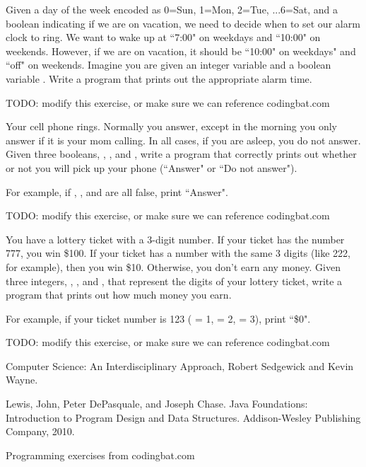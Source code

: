 \begin{exercise}
Given a day of the week encoded as 0=Sun, 1=Mon, 2=Tue, ...6=Sat, and a boolean indicating if we are on vacation, we need to decide when to set our alarm clock to ring. We want to wake up at ``7:00" on weekdays and ``10:00" on weekends. However, if we are on vacation, it should be ``10:00" on weekdays" and ``off" on weekends. Imagine you are given an integer variable  and a boolean variable . Write a program that prints out the appropriate alarm time.

TODO: modify this exercise, or make sure we can reference codingbat.com
\end{exercise}

\begin{exercise}
Your cell phone rings. Normally you answer, except in the morning you only answer if it is your mom calling. In all cases, if you are asleep, you do not answer. Given three booleans, , , and , write a program that correctly prints out whether or not you will pick up your phone (``Answer" or ``Do not answer"). 

For example, if , , and  are all false, print ``Answer". 

TODO: modify this exercise, or make sure we can reference codingbat.com
\end{exercise}

\begin{exercise}
You have a lottery ticket with a 3-digit number. If your ticket has the number 777, you win \$100. If your ticket has a number with the same 3 digits (like 222, for example), then you win \$10. Otherwise, you don't earn any money. Given three integers, , , and , that represent the digits of your lottery ticket, write a program that prints out how much money you earn.

For example, if your ticket number is 123 ( = 1,  = 2,  = 3), print ``\$0". 

TODO: modify this exercise, or make sure we can reference codingbat.com
\end{exercise}


Computer Science: An Interdisciplinary Approach, Robert Sedgewick and Kevin Wayne.

Lewis, John, Peter DePasquale, and Joseph Chase. Java Foundations: Introduction to Program Design and Data Structures. Addison-Wesley Publishing Company, 2010.

Programming exercises from codingbat.com